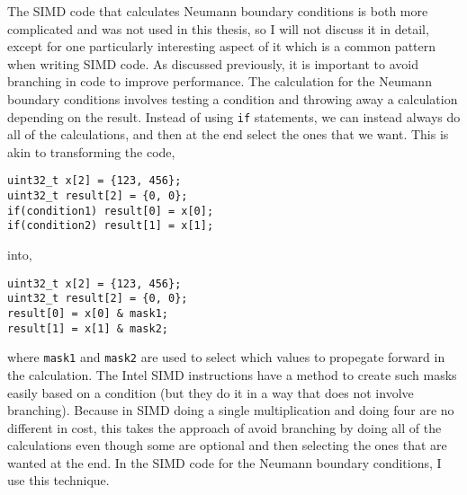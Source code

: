 The SIMD code that calculates Neumann boundary conditions is both more complicated and was not used in this thesis, so I will not discuss it in detail, except for one
particularly interesting aspect of it which is a common pattern when writing SIMD code. As discussed previously, it is important to avoid branching in code to improve
performance. The calculation for the Neumann boundary conditions involves testing a condition and throwing away a calculation depending on the result. Instead of
using \texttt{if} statements, we can instead always do all of the calculations, and then at the end select the ones that we want. This is akin to transforming the
code,
\begin{addmargin}[4em]{2em}%
\begin{singlespace}
\texttt{uint32\_t x[2] = \{123, 456\};}\\
\texttt{uint32\_t result[2] = \{0, 0\};}\\
\texttt{if(condition1) result[0] = x[0];}\\
\texttt{if(condition2) result[1] = x[1];}\\
\end{singlespace}
\end{addmargin}
into,
\begin{addmargin}[4em]{2em}%
\begin{singlespace}
\texttt{uint32\_t x[2] = \{123, 456\};}\\
\texttt{uint32\_t result[2] = \{0, 0\};}\\
\texttt{result[0] = x[0] \& mask1;}\\
\texttt{result[1] = x[1] \& mask2;}\\
\end{singlespace}
\end{addmargin}
where \texttt{mask1} and \texttt{mask2} are used to select which values to propegate forward in the calculation. The Intel SIMD instructions have a method to
create such masks easily based on a condition (but they do it in a way that does not involve branching). Because in SIMD doing a single multiplication and doing
four are no different in cost, this takes the approach of avoid branching by doing all of the calculations even though some are optional and then selecting the
ones that are wanted at the end.
In the SIMD code for the Neumann boundary conditions,
I use this technique.
